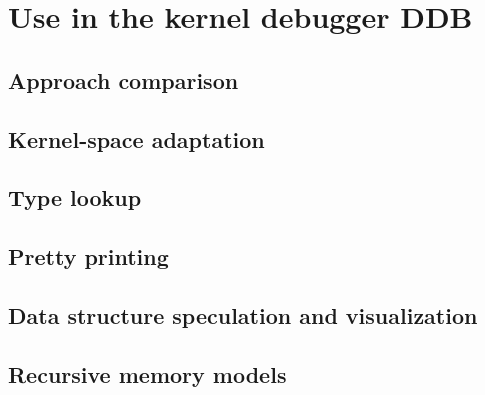 \chapter{Use in the kernel debugger DDB}

\section{Approach comparison}
\section{Kernel-space adaptation}
\section{Type lookup}
\section{Pretty printing}
\section{Data structure speculation and visualization}
\section{Recursive memory models}

